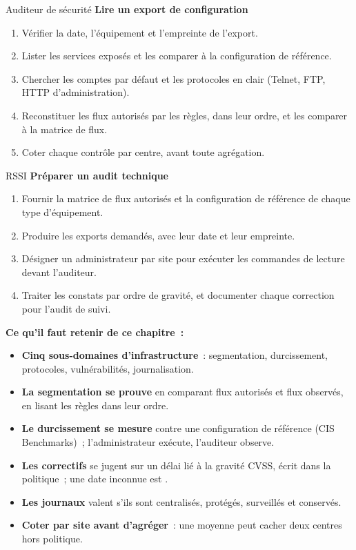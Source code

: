 \begin{boxmetier}{Auditeur de sécurité}
\textbf{Lire un export de configuration}
\begin{enumerate}
    \item Vérifier la date, l'équipement et l'empreinte de l'export.
    \item Lister les services exposés et les comparer à la configuration de
          référence.
    \item Chercher les comptes par défaut et les protocoles en clair
          (Telnet, FTP, HTTP d'administration).
    \item Reconstituer les flux autorisés par les règles, dans leur ordre,
          et les comparer à la matrice de flux.
    \item Coter chaque contrôle par centre, avant toute agrégation.
\end{enumerate}
\end{boxmetier}

\begin{boxmetier}{RSSI}
\textbf{Préparer un audit technique}
\begin{enumerate}
    \item Fournir la matrice de flux autorisés et la configuration de
          référence de chaque type d'équipement.
    \item Produire les exports demandés, avec leur date et leur empreinte.
    \item Désigner un administrateur par site pour exécuter les commandes
          de lecture devant l'auditeur.
    \item Traiter les constats par ordre de gravité, et documenter chaque
          correction pour l'audit de suivi.
\end{enumerate}
\end{boxmetier}

\separateur

\begin{boxresume}
\textbf{Ce qu'il faut retenir de ce chapitre~:}
\begin{itemize}
    \item \textbf{Cinq sous-domaines d'infrastructure}~: segmentation,
          durcissement, protocoles, vulnérabilités, journalisation.
    \item \textbf{La segmentation se prouve} en comparant flux autorisés et
          flux observés, en lisant les règles dans leur ordre.
    \item \textbf{Le durcissement se mesure} contre une configuration de
          référence (CIS Benchmarks)~; l'administrateur exécute, l'auditeur
          observe.
    \item \textbf{Les correctifs} se jugent sur un délai lié à la gravité
          CVSS, écrit dans la politique~; une date inconnue est \NEK{}.
    \item \textbf{Les journaux} valent s'ils sont centralisés, protégés,
          surveillés et conservés.
    \item \textbf{Coter par site avant d'agréger}~: une moyenne peut cacher
          deux centres hors politique.
\end{itemize}
\end{boxresume}

